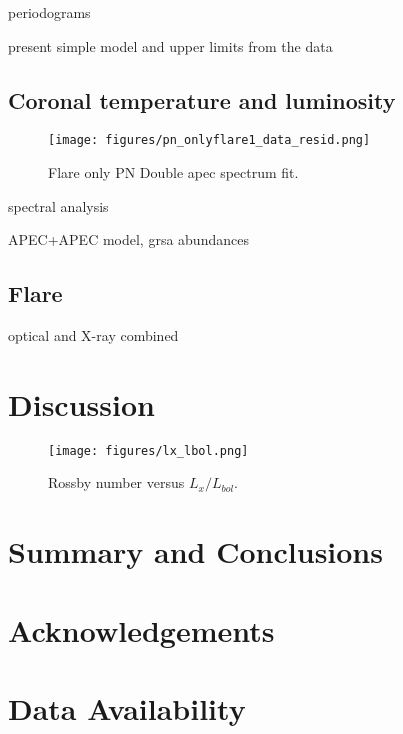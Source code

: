 \documentclass[twocolumn]{aastex631}
\begin{document}
periodograms

present simple model and upper limits from the data

\subsection{Coronal temperature and luminosity}


\begin{figure}[ht!]
    \begin{centering}
        \texttt{[image: figures/pn\_onlyflare1\_data\_resid.png]}
        \caption{
         Flare only PN Double apec spectrum fit.
        }
        \label{fig:spec_pn_onlyflare}
    \end{centering}
\end{figure}


spectral analysis

APEC+APEC model, grsa abundances

\subsection{Flare}

optical and X-ray combined

\section{Discussion}

\begin{figure}[ht!]
    \begin{centering}
        \texttt{[image: figures/lx\_lbol.png]}
        \caption{
         Rossby number versus $L_x/L_{bol}$.
        }
        \label{fig:lxlbol}
    \end{centering}
\end{figure}


\section{Summary and Conclusions}


\section{Acknowledgements}
\citep{lightkurvecollaboration2018lightkurve}

\section{Data Availability}



\end{document}
